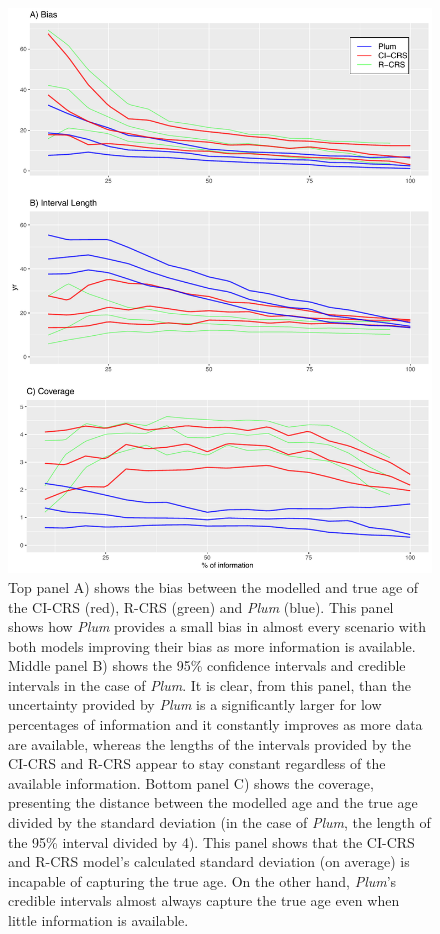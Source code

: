 \documentclass [10pt] {article}
\begin{document}
\begin{figure}[!]
 \centering
  \includegraphics[width=.65\linewidth]{AccPrec.pdf}
	\caption{Top panel A) shows the bias between the modelled and true age of the CI-CRS (red), R-CRS (green) and \textit{Plum} (blue). This panel shows how \textit{Plum} provides a small bias in almost every scenario with both models improving their bias as more information is available. Middle panel B) shows the 95\% confidence intervals and credible intervals in the case of \textit{Plum}. It is clear, from this panel, than the uncertainty provided by \textit{Plum} is a significantly larger for low percentages of information and it constantly improves as more data are available, whereas the lengths of the intervals provided by the CI-CRS and R-CRS appear to stay constant regardless of the available information. Bottom panel C) shows the coverage, presenting the distance between the modelled age and the true age divided by the standard deviation (in the case of \textit{Plum}, the length of the 95\% interval divided by 4). This panel shows that the CI-CRS and R-CRS model's calculated standard deviation (on average) is incapable of capturing the true age. On the other hand, \textit{Plum}'s credible intervals almost always capture the true age even when little information is available.}
  \label{fig:accpre}
\end{figure}
\end{document}
